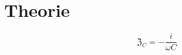\section{Theorie}
\label{sec:Theorie}
\begin{equation}
  \mathfrak{Z}_C = -\frac{i}{\omega C}
\end{equation}
